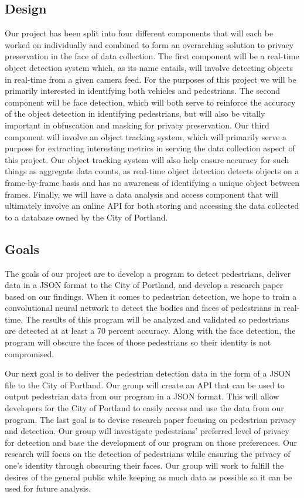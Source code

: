 \subsection{Design}
Our project has been split into four different components that will each be worked on individually and combined to form an overarching solution to privacy preservation in the face of data collection. The first component will be a real-time object detection system which, as its name entails, will involve detecting objects in real-time from a given camera feed. For the purposes of this project we will be primarily interested in identifying both vehicles and pedestrians. The second component will be face detection, which will both serve to reinforce the accuracy of the object detection in identifying pedestrians, but will also be vitally important in obfuscation and masking for privacy preservation. Our third component will involve an object tracking system, which will primarily serve a purpose for extracting interesting metrics in serving the data collection aspect of this project. Our object tracking system will also help ensure accuracy for such things as aggregate data counts, as real-time object detection detects objects on a frame-by-frame basis and has no awareness of identifying a unique object between frames. Finally, we will have a data analysis and access component that will ultimately involve an online API for both storing and accessing the data collected to a database owned by the City of Portland.

\subsection{Goals}
The goals of our project are to develop a program to detect pedestrians, deliver data in a JSON format to the City of Portland, and develop a research paper based on our findings. When it comes to pedestrian detection, we hope to train a convolutional neural network to detect the bodies and faces of pedestrians in real-time. The results of this program will be analyzed and validated so pedestrians are detected at at least a 70 percent accuracy. Along with the face detection, the program will obscure the faces of those pedestrians so their identity is not compromised. 

Our next goal is to deliver the pedestrian detection data in the form of a JSON file to the City of Portland. Our group will create an API that can be used to output pedestrian data from our program in a JSON format. This will allow developers for the City of Portland to easily access and use the data from our program. The last goal is to devise research paper focusing on pedestrian privacy and detection. Our group will investigate pedestrians’ preferred level of privacy for detection and base the development of our program on those preferences. Our research will focus on the detection of pedestrians while ensuring the privacy of one’s identity through obscuring their faces. Our group will work to fulfill the desires of the general public while keeping as much data as possible so it can be used for future analysis. 

